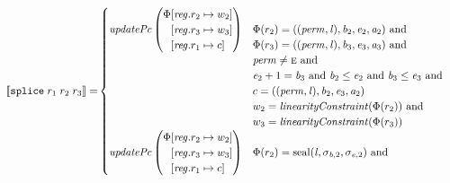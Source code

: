 \documentclass[a4paper]{article}
\newcommand{\sem}[1]{\left\llbracket #1 \right\rrbracket}
\newcommand{\tand}{\text{ and }}
\newcommand{\targetcolor}[1]{\color{black}}
\newcommand{\trg}[1]{{\targetcolor{} #1}}
\newcommand{\zinstr}[1]{\texttt{#1}}
\newcommand{\threeinstr}[4]{
  \ifthenelse{\equal{#2#3#4}{}}
  {\zinstr{#1}}
  {\zinstr{#1} \; #2 \; #3 \; #4}
}
\newcommand{\tsplice}[3]{\threeinstr{\trg{splice}}{#1}{#2}{#3}}
\newcommand{\update}[2]{[#1 \mapsto #2]}
\newcommand{\updReg}[2]{\update{\reg.#1}{#2}}
\newcommand{\shareddom}[1]{\mathrm{#1}}
\newcommand{\perm}{\var{perm}}
\newcommand{\lin}{\var{l}}
\newcommand{\seal}[1]{\shareddom{seal}(#1)}
\newcommand{\var}[1]{\mathit{#1}}
\newcommand{\reg}{\var{reg}}
\newcommand{\baddr}{\var{b}}
\newcommand{\eaddr}{\var{e}}
\newcommand{\aaddr}{\var{a}}
\newcommand{\plainperm}[1]{\textsc{#1}}
\newcommand{\enter}{\plainperm{e}}
\newcommand{\plainfun}[2]{
  \ifthenelse{\equal{#2}{}}
  {\mathit{#1}}
  {\mathit{#1}(#2)}
}
\newcommand{\updPcAddr}[1]{\plainfun{updatePc}{#1}}
\newcommand{\linCons}[1]{\plainfun{linearityConstraint}{#1}}
\begin{document}
\begin{align*}
  \sem{\tsplice{r_1}{r_2}{r_3}} = &
                              \begin{cases}
                                \updPcAddr{}\left(
                                \arraycolsep=0pt
                                \begin{array}{r l}
                                  \Phi&\updReg{r_2}{w_2}\\
                                      &\updReg{r_3}{w_3}\\
                                      &\updReg{r_1}{c}
                                \end{array}\right)
&
                                \arraycolsep=0pt
                                \begin{array}[t]{l}
                                  \Phi(r_2) = ((\perm,\lin),\baddr_2,\eaddr_2,\aaddr_2) \tand \\
                                  \Phi(r_3) = ((\perm,\lin),\baddr_3,\eaddr_3,\aaddr_3) \tand \\
                                  \perm \neq \enter \tand \\
                                  \eaddr_2 + 1 = \baddr_3 \tand \baddr_2 \leq \eaddr_2 \tand \baddr_3 \leq \eaddr_3 \tand \\
                                  c = ((\perm,\lin),\baddr_2,\eaddr_3,\aaddr_2) \\
                                  w_2 = \linCons{\Phi(r_2)} \tand \\
                                  w_3 = \linCons{\Phi(r_3)} \\
                                \end{array}\\
                                \updPcAddr{}\left(
                                \arraycolsep=0pt
                                \begin{array}{r l}
                                  \Phi&\updReg{r_2}{w_2}\\
                                      &\updReg{r_3}{w_3}\\
                                      &\updReg{r_1}{c}
                                \end{array}\right)
&
                                \arraycolsep=0pt
                                \begin{array}[t]{l}
                                  \Phi(r_2) = \seal{\lin,\sigma_{\baddr,2},\sigma_{\eaddr,2}} \tand \\

\end{array}
\end{cases}
\end{align*}
\end{document}
